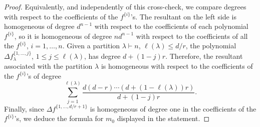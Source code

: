 \documentclass[12pt]{amsart}
\theoremstyle{definition}
\DeclareMathOperator{\len}{\ell}
\begin{document}
\begin{proof}
Equivalently, and independently of this cross-check, we compare degrees with respect to the coefficients of the $f^{\{i\}}$'s. The resultant on the left side is homogeneous of degree $d^{n-1}$ with respect to the coefficients of each polynomial $f^{\{i\}}$, so it is homogeneous of degree $nd^{n-1}$ with respect to the coefficients of all the $f^{\{i\}}$, $i=1,\dots,n$. Given a partition $\lambda \vdash n$, $\len(\lambda)\leqslant d/r$, the polynomial $\Delta f^{\{1,\dots,j\}}_\lambda$, $1\leqslant j \leqslant \len(\lambda)$, has degree $d+(1-j)r$. Therefore, the resultant associated with the partition $\lambda$ is homogeneous with respect to the coefficients of the $f^{\{i\}}$'s of degree
\[
\sum_{j=1}^{\len(\lambda)} \frac{d(d-r)\cdots(d+(1-\len(\lambda))r)}{d+(1-j)r}.
\]
Finally, since $\Delta f^{\{1,\dots,d/r+1\}}$ is homogeneous of degree one in the coefficients of the $f^{\{i\}}$'s, we deduce the formula for $m_0$ displayed in the statement.
\end{proof}
\end{document}
